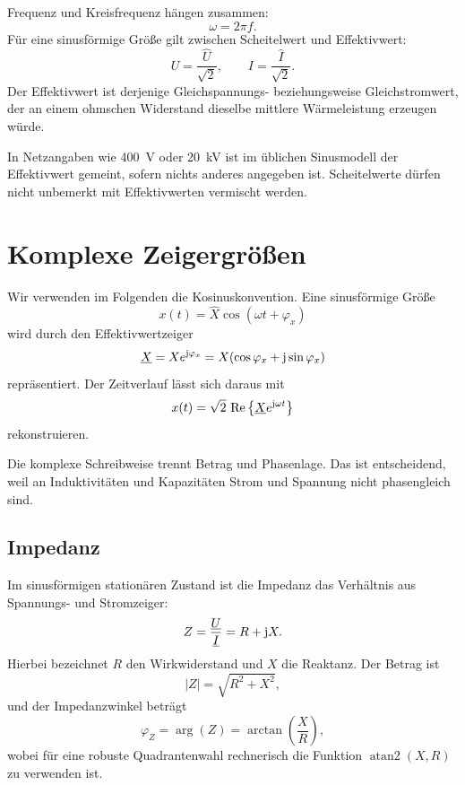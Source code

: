 Frequenz und Kreisfrequenz hängen zusammen:
\begin{equation}
  \omega=2\pi f.
\end{equation}
Für eine sinusförmige Größe gilt zwischen Scheitelwert und Effektivwert:
\begin{equation}
  U=\frac{\hat U}{\sqrt{2}},
  \qquad
  I=\frac{\hat I}{\sqrt{2}}.
\end{equation}
Der Effektivwert ist derjenige Gleichspannungs- beziehungsweise Gleichstromwert,
der an einem ohmschen Widerstand dieselbe mittlere Wärmeleistung erzeugen würde.

\begin{merke}
In Netzangaben wie \SI{400}{\volt} oder \SI{20}{\kilo\volt} ist im üblichen
Sinusmodell der Effektivwert gemeint, sofern nichts anderes angegeben ist.
Scheitelwerte dürfen nicht unbemerkt mit Effektivwerten vermischt werden.
\end{merke}

\section{Komplexe Zeigergrößen}

Wir verwenden im Folgenden die Kosinuskonvention. Eine sinusförmige Größe
\[
x(t)=\hat X\cos(\omega t+\varphi_x)
\]
wird durch den Effektivwertzeiger
\begin{equation}
  \underline{X}=X e^{\mathrm{j}\varphi_x}
  =X(\cos\varphi_x+\mathrm{j}\sin\varphi_x)
\end{equation}
repräsentiert. Der Zeitverlauf lässt sich daraus mit
\[
x(t)=\sqrt{2}\,\operatorname{Re}
\left\{\underline{X}e^{\mathrm{j}\omega t}\right\}
\]
rekonstruieren.

Die komplexe Schreibweise trennt Betrag und Phasenlage. Das ist entscheidend,
weil an Induktivitäten und Kapazitäten Strom und Spannung nicht phasengleich
sind.

\subsection{Impedanz}

Im sinusförmigen stationären Zustand ist die Impedanz das Verhältnis aus
Spannungs- und Stromzeiger:
\begin{equation}
  Z=\frac{\underline{U}}{\underline{I}}=R+\mathrm{j} X.
  \label{eq:impedanz}
\end{equation}
Hierbei bezeichnet \(R\) den Wirkwiderstand und \(X\) die Reaktanz.
Der Betrag ist
\[
|Z|=\sqrt{R^2+X^2},
\]
und der Impedanzwinkel beträgt
\[
\varphi_Z=\arg(Z)=\arctan\!\left(\frac{X}{R}\right),
\]
wobei für eine robuste Quadrantenwahl rechnerisch die Funktion
\(\operatorname{atan2}(X,R)\) zu verwenden ist.

